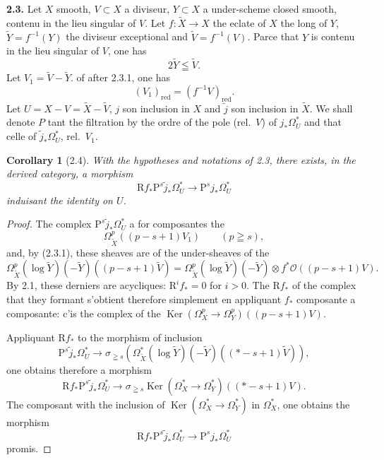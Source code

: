 \documentclass[12pt,a4paper]{article}
\theoremstyle{plain}
\newtheorem{corollary}[theorem]{Corollary}
\theoremstyle{definition}
\DeclareMathOperator{\Ker}{Ker}
\begin{document}
\medskip

\textbf{2.3.} Let $X$ smooth, $V \subset X$ a diviseur, $Y \subset X$ a under-scheme closed smooth, contenu in the lieu singular of $V$. Let $f : \tilde{X} \to X$ the eclate of $X$ the long of $Y$, $\tilde{Y} = f^{-1}(Y)$ the diviseur exceptional and $\tilde{V} = f^{-1}(V)$. Parce that $Y$ is contenu in the lieu singular of $V$, one has
\begin{equation}\label{eq:2.3.1}
2\tilde{Y} \leqq \tilde{V}.
\tag{2.3.1}
\end{equation}
Let $V_1 = \tilde{V} - \tilde{Y}$. of after 2.3.1, one has
\[
(V_1)_{\mathrm{red}} = (f^{-1}V)_{\mathrm{red}}.
\]
Let $U = X - V = \tilde{X} - \tilde{V}$, $j$ son inclusion in $X$ and $\tilde{j}$ son inclusion in $\tilde{X}$. We shall denote $P$ tant the filtration by the ordre of the pole (rel.\ $V$) of $j_* \Omega_U^*$ and that celle of $\tilde{j}_* \Omega_U^*$, rel.\ $V_1$.

\begin{corollary}[2.4]
With the hypotheses and notations of \emph{2.3}, there exists, in the derived category, a morphism
\begin{equation}\label{eq:2.4.1}
\mathrm{R}f_* \mathrm{P}^s \tilde{j}_* \Omega_U^* \to \mathrm{P}^s j_* \Omega_U^*
\tag{2.4.1}
\end{equation}
induisant the identity on $U$.
\end{corollary}

\begin{proof}[Proof]
The complex $\mathrm{P}^s \tilde{j}_* \Omega_U^*$ a for composantes the
\[
\Omega_{\tilde{X}}^p((p-s+1)V_1) \qquad (p \geqq s),
\]
and, by (2.3.1), these sheaves are of the under-sheaves of the
\[
\Omega_{\tilde{X}}^p(\log \tilde{Y})(-\tilde{Y})((p-s+1)\tilde{V}) = \Omega_{\tilde{X}}^p(\log \tilde{Y})(-\tilde{Y}) \otimes f^* \mathscr{O}((p-s+1)V).
\]
By 2.1, these derniers are acycliques: $\mathrm{R}^i f_* = 0$ for $i > 0$. The $\mathrm{R}f_*$ of the complex that they formant s'obtient therefore simplement en appliquant $f_*$ composante a composante: c'is the complex of the $\Ker(\Omega_X^p \to \Omega_Y^p)((p-s+1)V)$.

Appliquant $\mathrm{R}f_*$ to the morphism of inclusion
\[
\mathrm{P}^s \tilde{j}_* \Omega_U^* \to \sigma_{\geqq s}(\Omega_{\tilde{X}}^*(\log \tilde{Y})(-\tilde{Y})((*-s+1)\tilde{V})),
\]
one obtains therefore a morphism
\[
\mathrm{R}f_* \mathrm{P}^s \tilde{j}_* \Omega_U^* \to \sigma_{\geqq s} \Ker(\Omega_X^* \to \Omega_Y^*)((*-s+1)V).
\]
The composant with the inclusion of $\Ker(\Omega_X^* \to \Omega_Y^*)$ in $\Omega_X^*$, one obtains the morphism
\[
\mathrm{R}f_* \mathrm{P}^s \tilde{j}_* \Omega_U^* \to \mathrm{P}^s j_* \Omega_U^*
\]
promis.
\end{proof}
\end{document}
